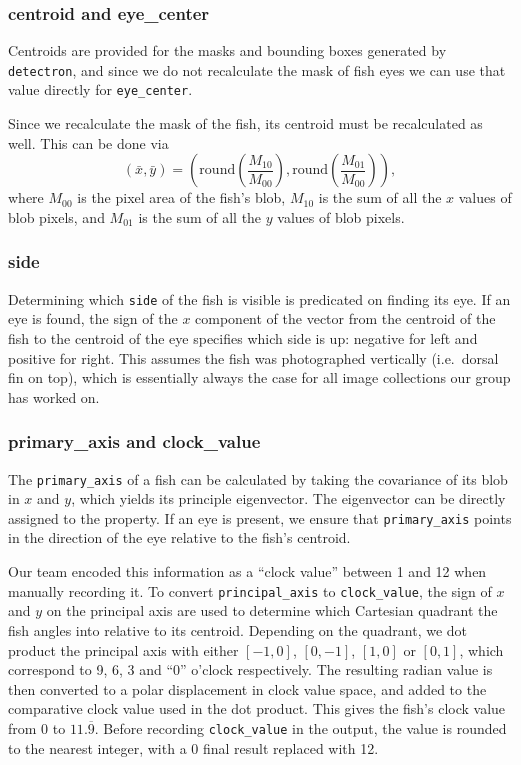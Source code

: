 \documentclass[conference]{IEEEtran}
\begin{document}
\subsubsection{centroid and eye\_center}
Centroids are provided for the masks and bounding boxes generated by \verb|detectron|, and since we do not recalculate the mask of fish eyes we can use that value directly for \verb|eye_center|.

Since we recalculate the mask of the fish, its centroid must be recalculated
as well. This can be done via
\begin{equation}
    (\bar{x}, \bar{y}) = (\mathrm{round}(\frac{M_{10}}{M_{00}}), \mathrm{round}(\frac{M_{01}}{M_{00}})),
\end{equation}
where \(M_{00}\) is the pixel area of the fish's blob, \(M_{10}\) is the sum of all the \(x\) values of blob pixels, and \(M_{01}\) is the sum of all the \(y\) values of blob pixels.
\subsubsection{side}
Determining which \verb|side| of the fish is visible is predicated on finding its eye. If an eye is found, the sign of the \(x\) component of the vector from the centroid of the fish to the centroid of the eye specifies which side is up: negative for left and positive for right. This assumes the fish was photographed vertically (i.e.\ dorsal fin on top), which is essentially always the case for all image collections our group has worked on.
\subsubsection{primary\_axis and clock\_value}
The \verb|primary_axis| of a fish can be calculated by taking the covariance of its blob in \(x\) and \(y\), which yields its principle eigenvector.
The eigenvector can be directly assigned to the property. If an eye is
present, we ensure that \verb|primary_axis| points in the direction of the
eye relative to the fish's centroid.

Our team encoded this information as a ``clock value'' between 1 and 12 when manually recording it. To convert \verb|principal_axis| to \verb|clock_value|, the sign of \(x\) and \(y\) on the principal axis are used to determine which Cartesian quadrant the fish angles into relative to its centroid. 
Depending on the quadrant, we dot product the principal axis with either \([-1,0]\), \([0,-1]\), \([1,0]\) or \([0,1]\), which correspond to 9, 6, 3 and ``0'' o'clock respectively. The resulting radian value is then converted to a polar displacement in clock value space, and added to the comparative clock value used in the dot product. This gives the fish's clock value from
0 to \(11.\overline{9}\). Before recording \verb|clock_value| in the output,
the value is rounded to the nearest integer, with a 0 final result replaced with 12.
\end{document}
